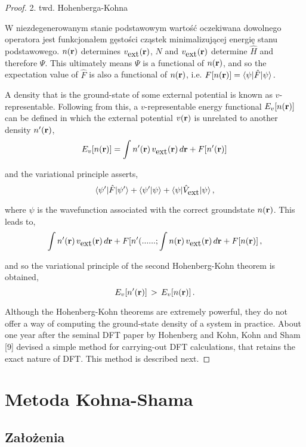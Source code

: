 \begin{proof}
2. twd. Hohenberga-Kohna

W niezdegenerowanym stanie podstawowym wartość oczekiwana dowolnego
operatora jest funkcjonałem gęstości cząstek minimalizującej energię
stanu podstawowego. $n({\bf r})$ determines $v_{\hbox{ext}}({\bf r})$,
$N$ and $v_{\hbox{ext}}({\bf r})$ determine $\hat{H}$ and therefore
$\Psi$. This ultimately means $\Psi$ is a functional of $n({\bf r})$,
and so the expectation value of $\hat{F}$ is also a functional of
$n({\bf r})$, i.e. ${\displaystyle F[n({\bf r})]=\langle\psi\vert\hat{F}\vert\psi\rangle\,.}$

A density that is the ground-state of some external potential is known
as $v$-representable. Following from this, a $v$-representable energy
functional $E_{v}[n({\bf r})]$ can be defined in which the external
potential $v({\bf r})$ is unrelated to another density $n'({\bf r})$,
\[
E_{v}[n({\bf r})]=\int n'({\bf r})\,v_{\hbox{ext}}({\bf r})\,d{\bf r}+F[n'({\bf r})]\,
\]


and the variational principle asserts, 
\[
{\displaystyle \langle\psi'\vert\hat{F}\vert\psi'\rangle+\langle\psi'\vert\psi\rangle+\langle\psi\vert\hat{V}_{\hbox{ext}}\vert\psi\rangle\thinspace,}
\]
 

where $\psi$ is the wavefunction associated with the correct groundstate
$n({\bf r})$. This leads to, 
\[
{\displaystyle \int n'({\bf r})\,v_{\hbox{ext}}({\bf r})\,d{\bf r}+F[n'(......;\int n({\bf r})\,v_{\hbox{ext}}({\bf r})\,d{\bf r}+F[n({\bf r})]\,,}
\]


and so the variational principle of the second Hohenberg-Kohn theorem
is obtained, 
\[
\ensuremath{{\displaystyle E_{v}[n'({\bf r})]\,>\,E_{v}[n({\bf r})]\,.}}
\]


Although the Hohenberg-Kohn theorems are extremely powerful, they
do not offer a way of computing the ground-state density of a system
in practice. About one year after the seminal DFT paper by Hohenberg
and Kohn, Kohn and Sham {[}9{]} devised a simple method for carrying-out
DFT calculations, that retains the exact nature of DFT. This method
is described next. 
\end{proof}

\section{Metoda Kohna-Shama}


\subsection{Założenia}


